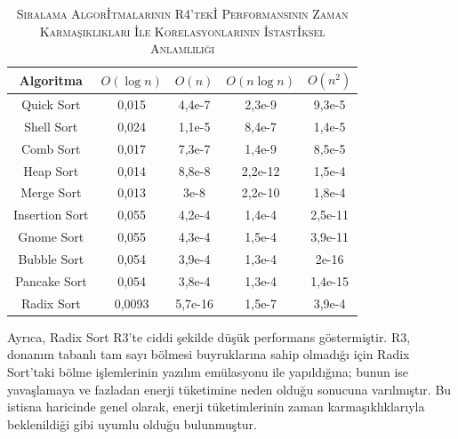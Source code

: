 \documentclass[conference, a4paper]{IEEEtran}
\begin{document}
\begin{table}[h]
  \centering
  \caption{\textsc{Sıralama Algor{\footnotesize İ}tmalarının R4'tek{\footnotesize İ} Performansının Zaman Karmaşıklıkları {\footnotesize İ}le Korelasyonlarının {\footnotesize İ}stast{\footnotesize İ}ksel Anlamlılığı}}
  \label{tab:time-complexity-vs-measurements-correlation-significance}
  \begin{tabular}{|c|c|c|c|c|}
    \hline
    {Algoritma} & {$O(\log n)$} & {$O(n)$} & {$O(n \log n)$} & {$O(n^2)$} \\
    \hline
    Quick Sort & 0,015 & 4,4e-7 & 2,3e-9 & 9,3e-5 \\
    \hline
    Shell Sort & 0,024 & 1,1e-5 & 8,4e-7 & 1,4e-5 \\
    \hline
    Comb Sort & 0,017 & 7,3e-7 & 1,4e-9 & 8,5e-5 \\
    \hline
    Heap Sort & 0,014 & 8,8e-8 & 2,2e-12 & 1,5e-4 \\
    \hline
    Merge Sort & 0,013 & 3e-8 & 2,2e-10 & 1,8e-4 \\
    \hline
    Insertion Sort & 0,055 & 4,2e-4 & 1,4e-4 & 2,5e-11 \\
    \hline
    Gnome Sort & 0,055 & 4,3e-4 & 1,5e-4 & 3,9e-11 \\
    \hline
    Bubble Sort & 0,054 & 3,9e-4 & 1,3e-4 & 2e-16 \\
    \hline
    Pancake Sort & 0,054 & 3,8e-4 & 1,3e-4 & 1,4e-15 \\
    \hline
    Radix Sort & 0,0093 & 5,7e-16 & 1,5e-7 & 3,9e-4 \\
    \hline
  \end{tabular}
\end{table}

Ayrıca, Radix Sort R3'te ciddi şekilde düşük performans göstermiştir. R3, donanım tabanlı tam sayı bölmesi buyruklarına sahip olmadığı için Radix Sort'taki bölme işlemlerinin yazılım emülasyonu ile yapıldığına; bunun ise yavaşlamaya ve fazladan enerji tüketimine neden olduğu sonucuna varılmıştır. Bu istisna haricinde genel olarak, enerji tüketimlerinin zaman karmaşıklıklarıyla beklenildiği gibi uyumlu olduğu bulunmuştur.
\end{document}
